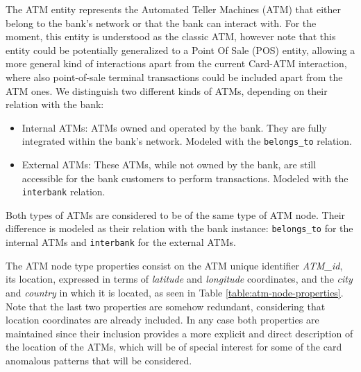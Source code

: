 The ATM entity represents the Automated Teller Machines (ATM) that either belong to the bank's network or that the bank can interact with.
For the moment, this entity is understood as the classic ATM, however note that this entity could be potentially generalized to a Point Of Sale (POS) entity, allowing a more general kind of interactions apart from the current Card-ATM interaction, where also point-of-sale terminal transactions could be included apart from the ATM ones. 
We distinguish two different kinds of ATMs, depending on their relation with the bank:
\begin{itemize}
  \item Internal ATMs: ATMs owned and operated by the bank. They are fully integrated within the
  bank's network. Modeled with the \texttt{belongs\_to} relation.
  \item External ATMs: These ATMs, while not owned by the bank, are still accessible for the bank
  customers to perform transactions. Modeled with the \texttt{interbank} relation. 
\end{itemize}

Both types of ATMs are considered to be of the same type of ATM node. Their difference
is modeled as their relation with the bank instance: \texttt{belongs\_to} for the internal ATMs and \texttt{interbank} for the external ATMs.



The ATM node type properties consist on the ATM unique identifier \emph{ATM\_id}, its location, expressed in terms of \emph{latitude} and \emph{longitude} coordinates, and the \emph{city} and 
\emph{country} in which it is located, as seen in Table \ref{table:atm-node-properties}.
Note that the last two properties are somehow redundant, considering that location coordinates
are already included. In any case both properties are maintained since their inclusion provides a more explicit and direct description of the location of the ATMs, which will be of special interest for some of the card anomalous patterns that will be considered.\\

